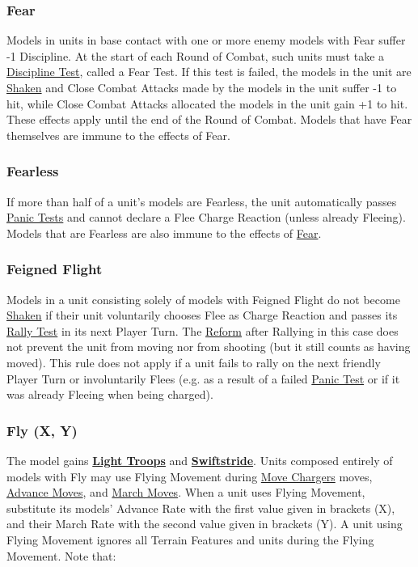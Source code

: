 \subsubsection{Fear}
\label{fear}

Models in units in base contact with one or more enemy models with Fear suffer -1 Discipline. At the start of each Round of Combat, such units must take a \hyperref[performing_a_discipline_test]{Discipline Test}, called a Fear Test. If this test is failed, the models in the unit are \hyperref[shaken]{Shaken} and Close Combat Attacks made by the models in the unit suffer -1 to hit, while Close Combat Attacks allocated  the models in the unit gain +1 to hit. These effects apply until the end of the Round of Combat. Models that have Fear themselves are immune to the effects of Fear.

\subsubsection{Fearless}
\label{fearless}

If more than half of a unit's models are Fearless, the unit automatically passes \hyperref[panic_test]{Panic Tests} and cannot declare a Flee Charge Reaction (unless already Fleeing). Models that are Fearless are also immune to the effects of \hyperref[fear]{Fear}.

\subsubsection{Feigned Flight}
\label{feigned_flight}

Models in a unit consisting solely of models with Feigned Flight do not become \hyperref[shaken]{Shaken} if their unit voluntarily chooses Flee as Charge Reaction and passes its \hyperref[rally_fleeing_units]{Rally Test} in its next Player Turn. The \hyperref[reform]{Reform} after Rallying in this case does not prevent the unit from moving nor from shooting (but it still counts as having moved). This rule does not apply if a unit fails to rally on the next friendly Player Turn or involuntarily Flees (e.g. as a result of a failed \hyperref[panic_test]{Panic Test} or if it was already Fleeing when being charged).

\subsubsection{Fly (X, Y)}
\label{fly}

The model gains \hyperref[light_troops]{\textbf{Light Troops}} and \hyperref[swiftstride]{\textbf{Swiftstride}}. Units composed entirely of models with Fly may use Flying Movement during \hyperref[move_chargers]{Move Chargers} moves, \hyperref[advance_move]{Advance Moves}, and \hyperref[march_move]{March Moves}. When a unit uses Flying Movement, substitute its models' Advance Rate with the first value given in brackets (X), and their March Rate with the second value given in brackets (Y). A unit using Flying Movement ignores all Terrain Features and units during the Flying Movement. Note that:

